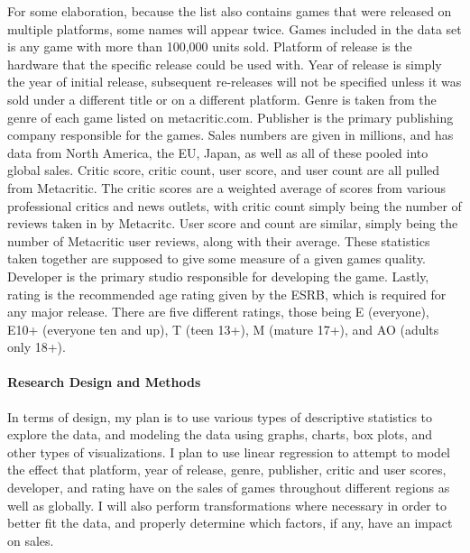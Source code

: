 \documentclass[12pt]{article}
\begin{document}
For some elaboration, because the list also contains games that were released on multiple platforms, some names will appear twice. 
Games included in the data set is any game with more than 100,000 units sold. Platform of release is the hardware that the specific 
release could be used with. Year of release is simply the year of initial release, subsequent re-releases will not be specified unless 
it was sold under a different title or on a different platform. Genre is taken from the genre of each game listed on metacritic.com. 
Publisher is the primary publishing company responsible for the games. Sales numbers are given in millions, and has data from North 
America, the EU, Japan, as well as all of these pooled into global sales. Critic score, critic count, user score, and user count are 
all pulled from Metacritic. The critic scores are a weighted average of scores from various professional critics and news outlets, with 
critic count simply being the number of reviews taken in by Metacritc. User score and count are similar, simply being the number of 
Metacritic user reviews, along with their average. These statistics taken together are supposed to give some measure of a given games 
quality. Developer is the primary studio responsible for developing the game. Lastly, rating is the recommended age rating given by 
the ESRB, which is required for any major release. There are five different ratings, those being E (everyone), E10+ (everyone ten and up), 
T (teen 13+), M (mature 17+), and AO (adults only 18+).


\paragraph{Research Design and Methods}
In terms of design, my plan is to use various types of descriptive statistics to explore the data, and modeling the data using graphs, 
charts, box plots, and other types of visualizations. I plan to use linear regression to attempt to model the effect that platform, 
year of release, genre, publisher, critic and user scores, developer, and rating have on the sales of games throughout different regions 
as well as globally. I will also perform transformations where necessary in order to better fit the data, and properly determine which 
factors, if any, have an impact on sales.
\end{document}
